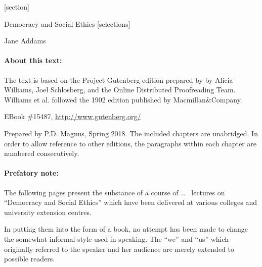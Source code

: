 \documentclass[]{article}
\newcommand*{\authortitle}[1]{\medskip\centerline{\Huge\sc #1}\bigskip}
\newcommand*{\itemtitle}[1]{\setstretch{1.8}\pagebreak[2]\begin{center}{\LARGE\sc #1}\end{center}\setstretch{1.2}}
\begin{document}
[section]
\newcommand*{\addamsparagraph}{\stepcounter{addamsparagraph}\paragraph{\small\P\arabic{addamsparagraph}}}


\newenvironment{sectionbody}{\begin{multicols}{2}%
}{\end{multicols}}


\itemtitle{Democracy and Social Ethics [selections]}

\authortitle{Jane Addams}


\paragraph{About this text:} The text is based on the Project Gutenberg edition prepared by by Alicia Williams, Joel Schlosberg, and the Online Distributed Proofreading Team. Williams et al. followed the 1902 edition published by Macmillan\&Company.

EBook \#15487, \url{http://www.gutenberg.org/}

Prepared by P.D. Magnus, Spring 2018. The included chapters are unabridged. In order to allow reference to other editions, the paragraphs within each chapter are numbered consecutively.



\setcounter{tocdepth}{1}
\tableofcontents

\pagestyle{fancy}
\lfoot{\thepage}
\cfoot{}


\bigskip


\paragraph{Prefatory note:} The following pages present the substance of a course of \ldots\ %
lectures on ``Democracy and Social Ethics'' which have been delivered at various colleges and university extension centres.

In putting them into the form of a book, no attempt has been made to change the somewhat informal style used in speaking. The ``we'' and ``us'' which originally referred to the speaker and her audience are merely extended to possible readers.
\end{document}
